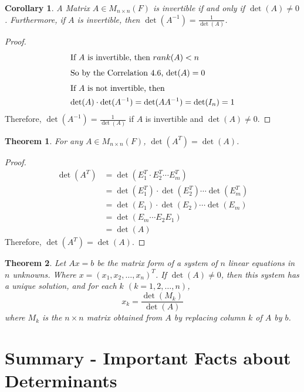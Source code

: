 \documentclass[10pt, oneside]{article}
\newtheorem{thm}{Theorem}
\newtheorem{cor}{Corollary}
\begin{document}
\begin{cor}
	A Matrix $A \in M_{n \times n}(F)$ is invertible if and only if $\det(A) \neq 0$. Furthermore, if $A$ is invertible, then $\det(A^{-1}) = \frac{1}{\det(A)}$.
\end{cor}

\begin{proof}
	\begin{align*}
		\intertext{If $A$ is invertible, then $rank(A) < n$}
		\intertext{So by the Correlation 4.6, $\det(A) = 0$}
		\intertext{If $A$ is not invertible, then}
		\det(A) \cdot \det(A^{-1}) & = \det(AA^{-1}) = \det(I_n) = 1 \\
	\end{align*}
	Therefore, $\det(A^{-1}) = \frac{1}{\det(A)}$ if $A$ is invertible and $\det(A) \neq 0$.
\end{proof}

\begin{thm}
	For any $A \in M_{n \times n}(F)$, $\det(A^T) = \det(A)$.
\end{thm}

\begin{proof}
	\begin{align*}
		\det(A^T) & = \det(E_1^T \cdot E_2^T \cdots E_m^T)             \\
		          & = \det(E_1^T) \cdot \det(E_2^T) \cdots \det(E_m^T) \\
		          & = \det(E_1) \cdot \det(E_2) \cdots \det(E_m)       \\
		          & = \det(E_m \cdots E_2E_1)                          \\
		          & = \det(A)
	\end{align*}
	Therefore, $\det(A^T) = \det(A)$.
\end{proof}

\begin{thm}
	Let $Ax = b$ be the matrix form of a system of $n$ linear equations in $n$ unknowns. Where $x = (x_1, x_2, \ldots, x_n)^T$. If $\det(A) \neq 0$, then this system has a unique solution, and
	for each $k$ $(k = 1, 2, \ldots, n)$,
	$$ x_k = \frac{\det(M_k)}{\det(A)} $$
	where $M_k$ is the $n \times n$ matrix obtained from $A$ by replacing column $k$ of $A$ by $b$.
\end{thm}
\section{Summary - Important Facts about Determinants}
\end{document}
